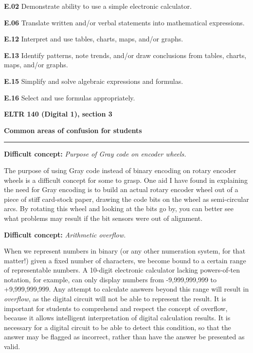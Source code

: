 \item{\bf E.02} Demonstrate ability to use a simple electronic calculator.
\item{\bf E.06} Translate written and/or verbal statements into mathematical expressions.
\item{\bf E.12} Interpret and use tables, charts, maps, and/or graphs.
\item{\bf E.13} Identify patterns, note trends, and/or draw conclusions from tables, charts, maps, and/or graphs.
\item{\bf E.15} Simplify and solve algebraic expressions and formulas.
\item{\bf E.16} Select and use formulas appropriately.
\medskip





\vfil \eject

\centerline{\bf ELTR 140 (Digital 1), section 3} \bigskip 
 
\vskip 10pt

\noindent
{\bf Common areas of confusion for students}

\vskip 5pt

\hrule \vskip 5pt

\vskip 10pt

\noindent
{\bf Difficult concept: } {\it Purpose of Gray code on encoder wheels.}

The purpose of using Gray code instead of binary encoding on rotary encoder wheels is a difficult concept for some to grasp.  One aid I have found in explaining the need for Gray encoding is to build an actual rotary encoder wheel out of a piece of stiff card-stock paper, drawing the code bits on the wheel as semi-circular arcs.  By rotating this wheel and looking at the bits go by, you can better see what problems may result if the bit sensors were out of alignment.

\vskip 10pt

\noindent
{\bf Difficult concept: } {\it Arithmetic overflow.}

When we represent numbers in binary (or any other numeration system, for that matter!) given a fixed number of characters, we become bound to a certain range of representable numbers.  A 10-digit electronic calculator lacking powers-of-ten notation, for example, can only display numbers from -9,999,999,999 to +9,999,999,999.  Any attempt to calculate answers beyond this range will result in {\it overflow}, as the digital circuit will not be able to represent the result.  It is important for students to comprehend and respect the concept of overflow, because it allows intelligent interpretation of digital calculation results.  It is necessary for a digital circuit to be able to detect this condition, so that the answer may be flagged as incorrect, rather than have the answer be presented as valid.

